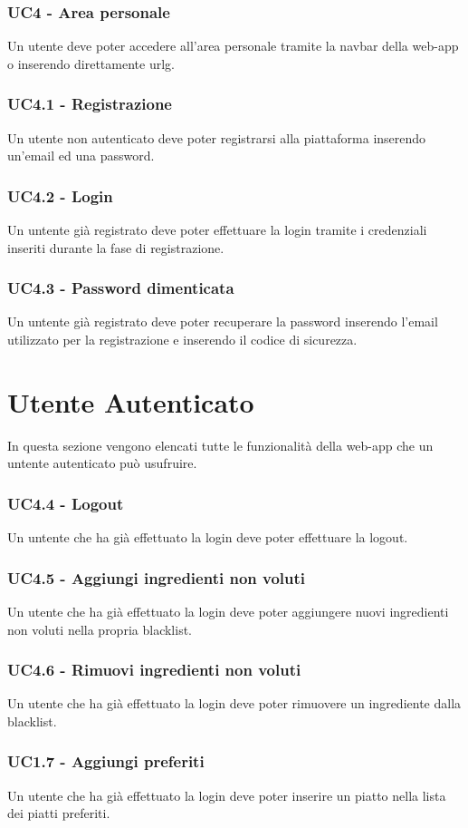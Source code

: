 \subsubsection{UC4 - Area personale}
Un utente deve poter accedere all'area personale tramite la navbar della web-app o inserendo direttamente \gls{urlg}.
\subsubsection{UC4.1 - Registrazione}
Un utente non autenticato deve poter registrarsi alla piattaforma inserendo un'email ed una password.
\subsubsection{UC4.2 - Login}
Un untente già registrato deve poter effettuare la login tramite i credenziali inseriti durante la fase di registrazione.
\subsubsection{UC4.3 - Password dimenticata}
Un untente già registrato deve poter recuperare la password inserendo l'email utilizzato per la registrazione e inserendo il codice di sicurezza.
\section{Utente Autenticato}
In questa sezione vengono elencati tutte le funzionalità della web-app che un untente autenticato può usufruire.
\subsubsection{UC4.4 - Logout}
Un untente che ha già effettuato la login deve poter effettuare la logout.
\subsubsection{UC4.5 - Aggiungi ingredienti non voluti}
Un utente che ha già effettuato la login deve poter aggiungere nuovi ingredienti non voluti nella propria blacklist.
\subsubsection{UC4.6 - Rimuovi ingredienti non voluti}
Un utente che ha già effettuato la login deve poter rimuovere un ingrediente dalla blacklist.
\subsubsection{UC1.7 - Aggiungi preferiti}
Un utente che ha già effettuato la login deve poter inserire un piatto nella lista dei piatti preferiti.
